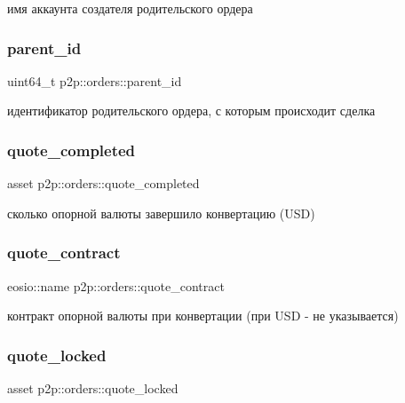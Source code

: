 имя аккаунта создателя родительского ордера \mbox{\label{structp2p_1_1orders_a587e23863136871fe42e47950037ae9c}} 
\subsubsection{\texorpdfstring{parent\+\_\+id}{parent\_id}}
{\footnotesize\ttfamily uint64\+\_\+t p2p\+::orders\+::parent\+\_\+id}

идентификатор родительского ордера, с которым происходит сделка \mbox{\label{structp2p_1_1orders_ad4da8c4849fb7f2488e3e000f9461002}} 
\subsubsection{\texorpdfstring{quote\+\_\+completed}{quote\_completed}}
{\footnotesize\ttfamily asset p2p\+::orders\+::quote\+\_\+completed}

сколько опорной валюты завершило конвертацию (U\+SD) \mbox{\label{structp2p_1_1orders_a033746dfead78477824e8ae920505faa}} 
\subsubsection{\texorpdfstring{quote\+\_\+contract}{quote\_contract}}
{\footnotesize\ttfamily eosio\+::name p2p\+::orders\+::quote\+\_\+contract}

контракт опорной валюты при конвертации (при U\+SD -\/ не указывается) \mbox{\label{structp2p_1_1orders_a1c5f68d399cb96227e42833374aee105}} 
\subsubsection{\texorpdfstring{quote\+\_\+locked}{quote\_locked}}
{\footnotesize\ttfamily asset p2p\+::orders\+::quote\+\_\+locked}

